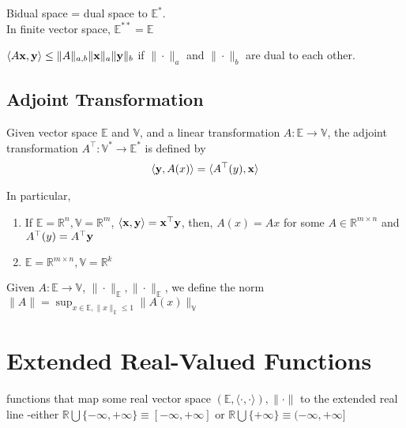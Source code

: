 \documentclass[11pt]{article}
\begin{document}
\begin{theorem}
    Bidual space = dual space to $\mathbb{E}^*$. \\
    In finite vector space, $\mathbb{E}^{**} = \mathbb{E}$
\end{theorem}

\begin{theorem}
    $\langle A{\mathbf{x}},{\mathbf{y}} \rangle \le \| A \|_{a,b} \| {\mathbf{x}} \|_{a} \| {\mathbf{y}} \|_{b}$ if $\| \cdot  \|_{a} $
        and $\| \cdot  \| _{b}$ are dual to each other.
\end{theorem}


\subsection{Adjoint Transformation}
\begin{definition}
    Given vector space $\mathbb{E}$ and $\mathbb{V}$, and a linear transformation $A: \mathbb{E} \to \mathbb{V}$,
        the adjoint transformation $A^\top: \mathbb{V}^* \to \mathbb{E}^*$ is defined by
        \begin{align*}
            \langle {\mathbf{y}}, A(x) \rangle = \langle A^\top(y), {\mathbf{x}} \rangle
        \end{align*}
\end{definition}


\begin{example}
    In particular,
    \begin{enumerate}
        \item If $\mathbb{E} = \mathbb{R}^n, \mathbb{V} = \mathbb{R}^m$, $\langle {\mathbf{x}},{\mathbf{y}} \rangle = {\mathbf{x}}^\top {\mathbf{y}}$,
            then, $A(x) = Ax$ for some $A \in \mathbb{R}^{m \times n}$ and $A^\top (y) = A^\top {\mathbf{y}}$
        \item $\mathbb{E} = \mathbb{R}^{m \times n}, \mathbb{V} = \mathbb{R}^k$
    \end{enumerate}
\end{example}

Given $A: \mathbb{E} \to \mathbb{V}$, $\| \cdot  \|_{\mathbb{E}}, \| \cdot  \|_{\mathbb{E}} $, we define the norm
$\| A \| =\sup_{x\in \mathbb{E}, \| x \|_{\mathbb{E}} \le 1 } \| A(x) \|_{\mathbb{V}} $


\section{Extended Real-Valued Functions}
\begin{definition}
    functions that map some real vector space $(\mathbb{E}, \langle \cdot ,\cdot  \rangle), \| \cdot  \| $ to
    the extended real line -either $\mathbb{R} \bigcup \{ -\infty,+\infty \} \equiv [-\infty,+\infty]$ or 
    $\mathbb{R} \bigcup \{ +\infty \} \equiv (-\infty,+\infty]$
\end{definition}
\end{document}
